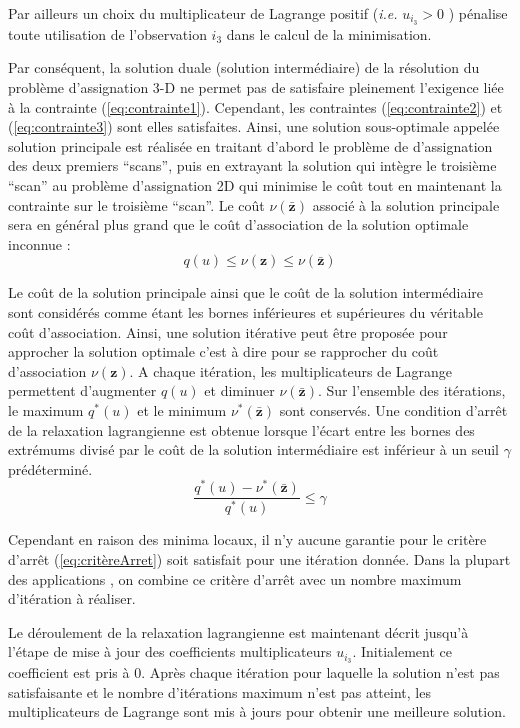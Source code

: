 \documentclass[10pt,french,a4paper]{report}
\begin{document}
Par ailleurs un choix du multiplicateur de Lagrange positif (\textit{i.e.} $u_{i_3} > 0$ ) pénalise toute utilisation de l'observation $i_3$ dans le calcul de la minimisation.

Par conséquent, la solution duale (solution intermédiaire) de la résolution du problème d'assignation 3-D ne
permet pas de satisfaire pleinement l'exigence liée à la contrainte (\ref{eq:contrainte1}). Cependant, les contraintes (\ref{eq:contrainte2}) et (\ref{eq:contrainte3})
sont elles satisfaites. Ainsi, une solution sous-optimale appelée solution principale est réalisée en traitant
d'abord le problème de d'assignation des deux premiers ``scans'', puis en extrayant la solution qui intègre le
troisième ``scan'' au problème d'assignation 2D qui minimise le coût tout en maintenant la contrainte sur le
troisième ``scan''. Le coût $\nu(\bar{\mathbf{z}})$ associé à la solution principale sera en général plus grand que le coût
d'association de la solution optimale inconnue :
\begin{equation}  
q(u) \leq \nu( \mathbf{z} ) \leq \nu(\bar{\mathbf{z}})
\end{equation}

Le coût de la solution principale ainsi que le coût de la solution intermédiaire sont considérés comme étant les
bornes inférieures et supérieures du véritable coût d'association. Ainsi, une solution itérative peut être proposée
pour approcher la solution optimale c'est à dire pour se rapprocher du coût d'association  $\nu( \mathbf{z} ) $. A chaque
itération, les multiplicateurs de Lagrange permettent d'augmenter $q(u)$ et diminuer $\nu(\bar{\mathbf{z}})$. Sur l'ensemble des itérations, le maximum $q^*(u)$ et le minimum $\nu^*(\bar{\mathbf{z}})$ sont conservés. Une condition d'arrêt de la relaxation
lagrangienne est obtenue lorsque l'écart entre les bornes des extrémums divisé par le coût de la solution
intermédiaire est inférieur à un seuil $\gamma$ prédéterminé.
\begin{equation} 
\label{eq:critèreArret} 
\frac{q^*(u) - \nu^*(\bar{\mathbf{z}})}{q^*(u) }\leq \gamma
\end{equation}

Cependant en raison des minima locaux, il n'y aucune garantie pour le critère d'arrêt (\ref{eq:critèreArret}) soit satisfait pour une
itération donnée. Dans la plupart des applications \cite{Blackman1999}, on combine ce critère d'arrêt avec un
nombre maximum d'itération à réaliser.

Le déroulement de la relaxation lagrangienne est maintenant décrit jusqu'à l'étape de mise à jour des
coefficients multiplicateurs $u_{i_3}$. Initialement ce coefficient est pris à 0. Après chaque itération pour laquelle la
solution n'est pas satisfaisante et le nombre d'itérations maximum n'est pas atteint, les multiplicateurs de
Lagrange sont mis à jours pour obtenir une meilleure solution.
\end{document}
